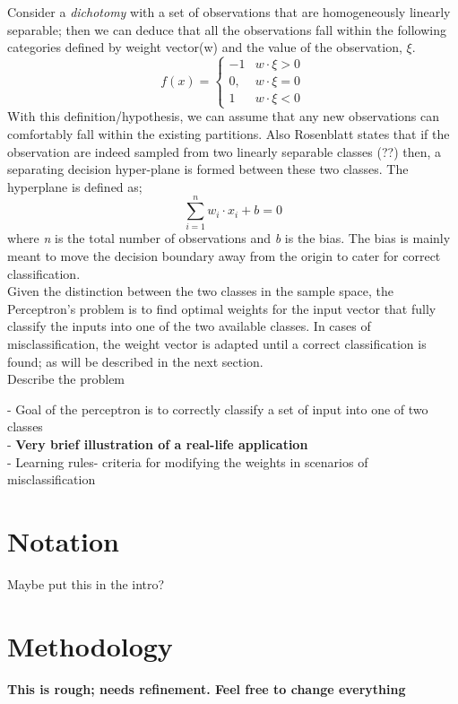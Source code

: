 \documentclass{article}
\begin{document}
{\color{red}
Consider a \textit{dichotomy} with a set of observations that are homogeneously linearly separable; then we can deduce that all the  observations fall within the following categories defined by weight vector(w) and the value of the observation, $\xi$.\\
\[
f(x) = 
\begin{cases}
    -1 &  w \cdot \xi > 0 \\
    0,   & w \cdot \xi = 0\\
    1           & w \cdot \xi < 0 
    
\end{cases}
\]}
With this definition/hypothesis, we can assume that any new observations can comfortably fall within the existing partitions. Also Rosenblatt states that if the observation are indeed sampled from two {\color{red}linearly separable classes (??)} then, a separating decision hyper-plane is formed between these two classes. The hyperplane is defined as;
\[
\sum_{i=1}^{n}w_i\cdot x_i + b =0
\]
where \textit{n} is the total number of observations and \textit{b} is the bias. The bias is mainly meant to move the decision boundary away from the origin to cater for correct classification.\\
\noindent Given the distinction between the two classes in the sample space, the Perceptron's problem is to find optimal weights for the input vector that fully classify the inputs into one of the two available classes. In cases of misclassification, the weight vector is adapted until a correct classification is found; as will be described in the next section.\\

Describe the problem

- Goal of the perceptron is to correctly classify a set of input into one of two classes\\
- \textbf{Very brief illustration of a real-life application}\\
- Learning rules- criteria for modifying the weights in scenarios of misclassification \\
\newpage


\section{Notation}

Maybe put this in the intro?

\section{Methodology}
\textbf{This is rough; needs refinement. Feel free to change everything}\\
\end{document}
